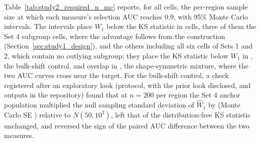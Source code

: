 \documentclass[AMA,Times1COL]{WileyNJDv5}
\begin{document}
Table~\ref{tab:study2_required_n_mc} reports, for all  cells, the per-region sample size at which each measure's selection AUC reaches 0.9, with 95\% Monte Carlo intervals. The intervals place $W_1$ below the KS statistic in  cells, three of them the Set 4 subgroup cells, where the advantage follows from the construction (Section~\ref{sec:study1_design}), and the others including all six cells of Sets 1 and 2, which contain no outlying subgroup; they place the KS statistic below $W_1$ in , the bulk-shift control, and overlap in , the shape-symmetric mixture, where the two AUC curves cross near the target. For the bulk-shift control, a check registered after an exploratory look (protocol, with the prior look disclosed, and outputs in the repository) found that at $n = 200$ per region the Set 4 anchor population multiplied the null sampling standard deviation of $\widehat{W}_1$ by  (Monte Carlo SE ) relative to $N(50, 10^2)$, left that of the distribution-free KS statistic unchanged, and reversed the sign of the paired AUC difference between the two measures.
\end{document}
